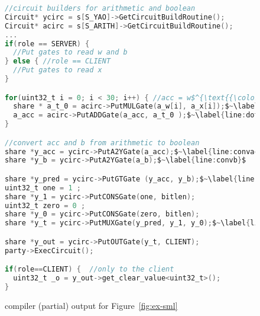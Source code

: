 \begin{figure}
\begin{lstlisting}[language=C, mathescape=true]
//circuit builders for arithmetic and boolean
Circuit* ycirc = s[S_YAO]->GetCircuitBuildRoutine();
Circuit* acirc = s[S_ARITH]->GetCircuitBuildRoutine();
...
if(role == SERVER) { 
  //Put gates to read w and b
} else { //role == CLIENT
  //Put gates to read x
}

for(uint32_t i = 0; i < 30; i++) { //acc = w$^{\text{{\color{red}T}}}$x$~\label{line:dotproductloop}$
  share * a_t_0 = acirc->PutMULGate(a_w[i], a_x[i]);$~\label{line:dotmulgate}$
  a_acc = acirc->PutADDGate(a_acc, a_t_0 );$~\label{line:dotaddgate}$
}

//convert acc and b from arithmetic to boolean
share *y_acc = ycirc->PutA2YGate(a_acc);$~\label{line:convacc}$
share *y_b = ycirc->PutA2YGate(a_b);$~\label{line:convb}$

share *y_pred = ycirc->PutGTGate (y_acc, y_b);$~\label{line:condyaobegin}$
uint32_t one = 1 ;
share *y_1 = ycirc->PutCONSGate(one, bitlen);
uint32_t zero = 0 ;
share *y_0 = ycirc->PutCONSGate(zero, bitlen);
share *y_t = ycirc->PutMUXGate(y_pred, y_1, y_0);$~\label{line:condyaoend}$

share *y_out = ycirc->PutOUTGate(y_t, CLIENT);
party->ExecCircuit();

if(role==CLIENT) {  //only to the client
  uint32_t _o = y_out->get_clear_value<uint32_t>();
}
\end{lstlisting}
\caption{\tool compiler (partial) output for Figure~\ref{fig:ex-sml}}
\label{fig:ex-aby}
\end{figure}

